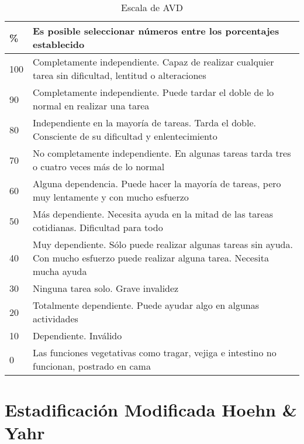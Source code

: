 \begin{table}[H]
\begin{center}
\begin{tabular}{|p{1cm}|p{11cm}|}
\hline
\% & Es posible seleccionar números entre los porcentajes establecido \\\hline \hline
100 & Completamente independiente. Capaz de realizar cualquier tarea sin dificultad, lentitud o alteraciones \\\hline
 90 & Completamente independiente. Puede tardar el doble de lo normal en realizar una tarea \\\hline
 80 & Independiente en la mayoría de tareas. Tarda el doble. Consciente de su dificultad y enlentecimiento \\\hline
 70 & No completamente independiente. En algunas tareas tarda tres o cuatro veces más de lo normal \\\hline
 60 & Alguna dependencia. Puede hacer la mayoría de tareas, pero muy lentamente y con mucho esfuerzo \\\hline
 50 & Más dependiente. Necesita ayuda en la mitad de las tareas cotidianas. Dificultad para todo \\\hline
 40 & Muy dependiente. Sólo puede realizar algunas tareas sin ayuda. Con mucho esfuerzo puede realizar alguna tarea. Necesita mucha ayuda \\\hline
 30 & Ninguna tarea solo. Grave invalidez \\\hline
 20 & Totalmente dependiente. Puede ayudar algo en algunas actividades\\\hline 
 10 & Dependiente. Inválido \\\hline
 0 & Las funciones vegetativas como tragar, vejiga e intestino no funcionan, postrado en cama \\\hline
\end{tabular}
\caption{Escala de AVD}
\end{center}
\end{table}

\section{Estadificación Modificada Hoehn \& Yahr}

